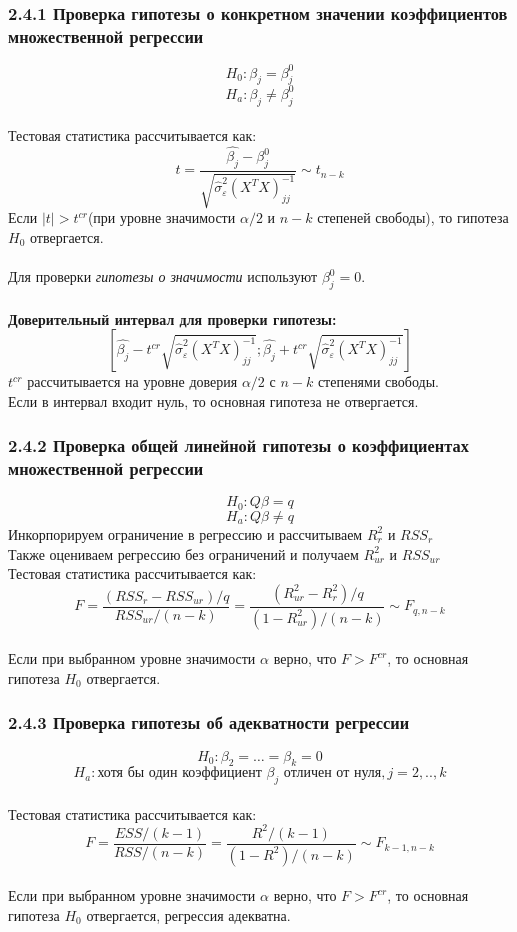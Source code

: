 \documentclass[a0,final]{a0poster}
\begin{document}
\begin{multicols}{4}
\subsubsection*{\textbf{2.4.1 Проверка гипотезы о конкретном значении коэффициентов множественной регрессии}}
\[H_0: \beta_j = \beta_j^0\]
\[H_a: \beta_j \ne \beta_j^0\]
\\
Тестовая статистика рассчитывается как:
\[t = \frac{\hat{\beta_j} - \beta_j^0}{\sqrt{\hat{\sigma}^2_{\varepsilon}(X^TX)^{-1}_{jj}}} \sim t_{n-k}\]
Если $|t| > t^{cr}$(при уровне значимости $\alpha/2$ и $n-k$ степеней свободы), то гипотеза $H_0$ отвергается.  \\
\\
Для проверки \textit{гипотезы о значимости} используют $\beta_j^0 = 0$. \\
\\
\textbf{Доверительный интервал для проверки гипотезы:} \\
\[[\hat{\beta_j} - t^{cr}\sqrt{\hat{\sigma}^2_{\varepsilon}(X^TX)^{-1}_{jj}}; \hat{\beta_j} + t^{cr}\sqrt{\hat{\sigma}^2_{\varepsilon}(X^TX)^{-1}_{jj}}]\]
$t^{cr}$ рассчитывается на уровне доверия $\alpha/2$ с $n-k$ степенями свободы.\\
Если в интервал входит нуль, то основная гипотеза не отвергается.
\subsubsection*{\textbf{2.4.2 Проверка общей линейной гипотезы о коэффициентах множественной регрессии}}
\[H_0: Q\beta=q\]
\[H_a: Q\beta \ne q\]
Инкорпорируем ограничение в регрессию и рассчитываем $R^2_r$ и $RSS_r$ \\
Также оцениваем регрессию без ограничений и получаем $R^2_{ur}$ и $RSS_{ur}$
\\
Тестовая статистика рассчитывается как:
\[F = \frac{(RSS_r - RSS_{ur})/q}{RSS_{ur}/(n-k)} = \frac{(R^2_{ur}-R^2_{r})/q}{(1-R^2_{ur})/(n-k)} \sim F_{q, n-k}\] \\
Если при выбранном уровне значимости $\alpha$ верно, что $F > F^{cr}$, то основная гипотеза $H_0$ отвергается.

\subsubsection*{\textbf{2.4.3 Проверка гипотезы об адекватности регрессии}}
\[H_0: \beta_2 = \ldots = \beta_k = 0\]
\[H_a: \text{хотя бы один коэффициент } \beta_j \text{ отличен от нуля}, j=2,..,k\]
\\
Тестовая статистика рассчитывается как:
\[F = \frac{ESS/(k-1)}{RSS/(n-k)} = \frac{R^2/(k-1)}{(1-R^2)/(n-k)} \sim F_{k-1, n-k}\] \\
Если при выбранном уровне значимости $\alpha$ верно, что $F > F^{cr}$, то основная гипотеза $H_0$ отвергается, регрессия адекватна.


\end{multicols}
\end{document}

